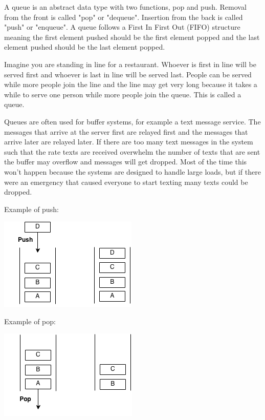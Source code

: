\documentclass[11pt,oneside]{book}
\makeatletter
\def\maxwidth#1{\ifdim\Gin@nat@width>#1 #1\else\Gin@nat@width\fi}
\makeatother
\begin{document}
A queue is an abstract data type with two functions, pop and push. Removal from the front is called "pop" or "dequeue". Insertion from the back is called "push" or "enqueue". A queue follows a First In First Out (FIFO) structure meaning the first element pushed should be the first element popped and the last element pushed should be the last element popped.

Imagine you are standing in line for a restaurant. Whoever is first in line will be served first and whoever is last in line will be served last. People can be served while more people join the line and the line may get very long because it takes a while to serve one person while more people join the queue. This is called a queue.

Queues are often used for buffer systems, for example a text message service. The messages that arrive at the server first are relayed first and the messages that arrive later are relayed later. If there are too many text messages in the system such that the rate  texts are received overwhelm the number of texts that are sent the buffer may overflow and messages will get dropped. Most of the time this won't happen because the systems are designed to handle large loads, but if there were an emergency that caused everyone to start texting many texts could be dropped.

Example of push:

\vspace{5px}\includegraphics[width=\maxwidth{\textwidth}]{queue.png}

Example of pop:

\vspace{5px}\includegraphics[width=\maxwidth{\textwidth}]{queue2.png}
\end{document}
